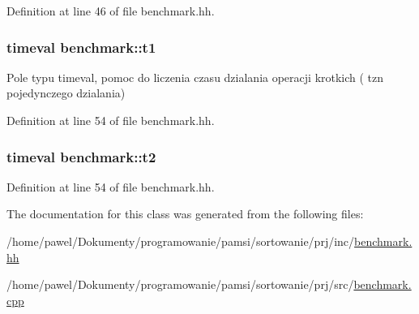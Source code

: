 Definition at line 46 of file benchmark.\-hh.

\hypertarget{classbenchmark_a7789217b36df3b3ae427ceaaa2694d0b}{
\subsubsection[{t1}]{\setlength{\rightskip}{0pt plus 5cm}timeval benchmark\-::t1\hspace{0.3cm}{\ttfamily [private]}}}\label{classbenchmark_a7789217b36df3b3ae427ceaaa2694d0b}


Pole typu timeval, pomoc do liczenia czasu dzialania operacji krotkich ( tzn pojedynczego dzialania) 



Definition at line 54 of file benchmark.\-hh.

\hypertarget{classbenchmark_aea9f22e585c0c5826329e48a97a99803}{
\subsubsection[{t2}]{\setlength{\rightskip}{0pt plus 5cm}timeval benchmark\-::t2\hspace{0.3cm}{\ttfamily [private]}}}\label{classbenchmark_aea9f22e585c0c5826329e48a97a99803}


Definition at line 54 of file benchmark.\-hh.



The documentation for this class was generated from the following files\-:\begin{DoxyCompactItemize}
\item 
/home/pawel/\-Dokumenty/programowanie/pamsi/sortowanie/prj/inc/\hyperlink{benchmark_8hh}{benchmark.\-hh}\item 
/home/pawel/\-Dokumenty/programowanie/pamsi/sortowanie/prj/src/\hyperlink{benchmark_8cpp}{benchmark.\-cpp}\end{DoxyCompactItemize}
